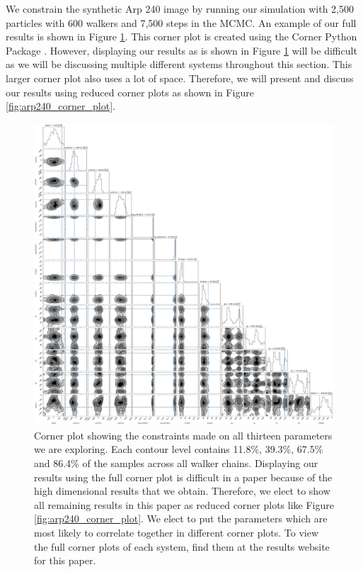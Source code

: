 We constrain the synthetic Arp 240 image by running our simulation with 2,500 particles with 600 walkers and 7,500 steps in the MCMC. An example of our full results is shown in Figure \ref{fig:corner_plot}. This corner plot is created using the Corner Python Package \citep{corner}. However, displaying our results as is shown in Figure \ref{fig:corner_plot} will be difficult as we will be discussing multiple different systems throughout this section. This larger corner plot also uses a lot of space. Therefore, we will present and discuss our results using reduced corner plots as shown in Figure \ref{fig:arp240_corner_plot}.

\begin{figure}
    \centering
    \includegraphics[width=\textwidth]{Chapter1/figures/Arp240-full-corner.pdf}
    \caption[Corner plot showing the constraints made on all thirteen parameters we are exploring.]{Corner plot showing the constraints made on all thirteen parameters we are exploring. Each contour level contains 11.8\%, 39.3\%, 67.5\% and 86.4\% of the samples across all walker chains. Displaying our results using the full corner plot is difficult in a paper because of the high dimensional results that we obtain. Therefore, we elect to show all remaining results in this paper as reduced corner plots like Figure \ref{fig:arp240_corner_plot}. We elect to put the parameters which are most likely to correlate together in different corner plots. To view the full corner plots of each system, find them at the results website for this paper.}
    \label{fig:corner_plot}
\end{figure}

